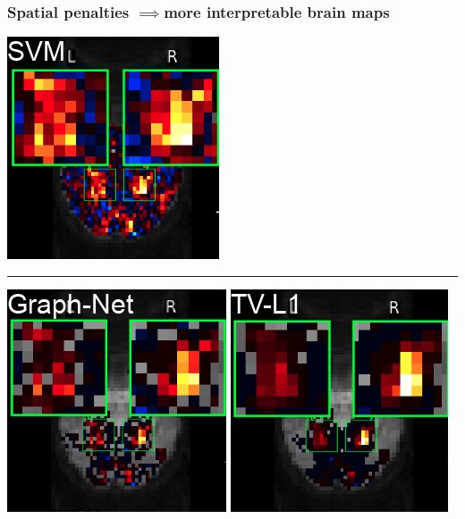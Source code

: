 \documentclass{beamer}
\def\leadto{$\mathbf{\implies}$}
\begin{document}
\begin{frame}
  \frametitle{Spatial penalties \leadto more interpretable brain maps}
  \centering
  {\includegraphics[width=.28\textwidth]{svm_with_title.png}}

  \medskip
  
  \hrule
  
  \medskip
  {\includegraphics[width=.28\textwidth]{graphnet_with_title.png}}
  {\includegraphics[width=.28\textwidth]{tvl1_with_title.png}}

\end{frame}
\end{document}
